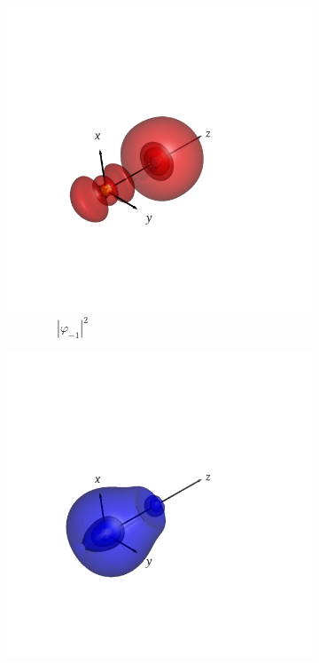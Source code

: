\documentclass[journal=inoraj,manuscript=article]{achemso}
\begin{document}
\begin{figure}[!h]
    \vspace{0.0cm}
    \begin{subfigure}[t]{0.30\textwidth}
        \centering
        \includegraphics[width=\linewidth]{./AuHg+/nocv-1.png} 
        \caption*{\ \ \ \ \ \ \ \ $|\varphi_{-1}|^2$} 
    \end{subfigure}
    \hfill
    \begin{subfigure}[t]{0.30\textwidth}
        \centering
        \includegraphics[width=\linewidth]{./AuHg+/nocv+1.png} 

\end{subfigure}
\end{figure}
\end{document}

